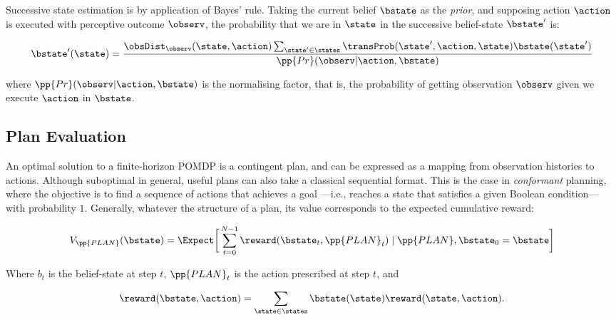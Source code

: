 Successive state estimation is by application of Bayes'
rule.  Taking the current belief $\bstate$ as the {\em prior}, and
supposing action $\action$ is executed with perceptive outcome
$\observ$, the probability that we are in $\state$ in the
successive belief-state $\bstate'$ is:

\begin{equation}\label{eq:revision}
\bstate'(\state) = \frac{\obsDist_\observ(\state, \action)
  \sum_{\state'\in \states} \transProb(\state', \action, \state) \bstate(\state') }{\pp{Pr}(\observ | \action, \bstate)}
\end{equation}

\noindent where $\pp{Pr}(\observ | \action, \bstate)$ is the
normalising factor, that is, the probability of getting observation
$\observ$ given we execute $\action$ in $\bstate$.

\subsection{Plan Evaluation}

An optimal solution to a finite-horizon POMDP is a contingent plan,
and can be expressed as a mapping from observation histories to
actions. Although suboptimal in general, useful plans can also take a
classical sequential format. This is the case in {\em conformant}
planning, where the objective is to find a sequence of actions that
achieves a goal ---i.e., reaches a state that satisfies a given
Boolean condition--- with probability $1$.  Generally, whatever the
structure of a plan, its value corresponds to the expected cumulative
reward:


\begin{equation}\label{eq:expectedvalue}
V_{\pp{PLAN}}(\bstate) = \Expect \bigg{[} 
\sum_{t=0}^{N-1}  \reward(\bstate_t, \pp{PLAN}_t) \mid \pp{PLAN}, \bstate_0 = \bstate \bigg{]}
\end{equation}

\noindent Where $b_t$ is the belief-state at step $t$, $\pp{PLAN}_t$ is
the action prescribed at step $t$, and

\[\reward(\bstate, \action) = \sum_{\state \in \states}
\bstate(\state)\reward(\state, \action).\] 



